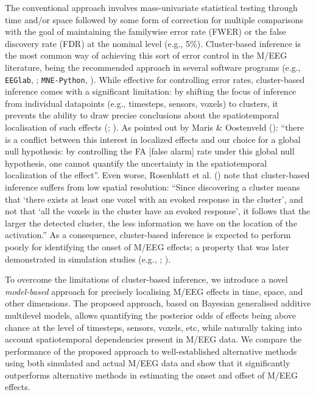 \documentclass[
  doc,
  floatsintext,
  longtable,
  a4paper,
  nolmodern,
  notxfonts,
  notimes,
  colorlinks=true,linkcolor=blue,citecolor=blue,urlcolor=blue]{apa7}
\begin{document}
The conventional approach involves mass-univariate statistical testing
through time and/or space followed by some form of correction for
multiple comparisons with the goal of maintaining the familywise error
rate (FWER) or the false discovery rate (FDR) at the nominal level
(e.g., 5\%). Cluster-based inference is the most common way of achieving
this sort of error control in the M/EEG literature, being the
recommended approach in several software programs (e.g.,
\texttt{EEGlab}, ;
\texttt{MNE-Python}, ). While
effective for controlling error rates, cluster-based inference comes
with a significant limitation: by shifting the focus of inference from
individual datapoints (e.g., timesteps, sensors, voxels) to clusters, it
prevents the ability to draw precise conclusions about the
spatiotemporal localisation of such effects
(;
). As
pointed out by Maris \& Oostenveld ():
``there is a conflict between this interest in localized effects and our
choice for a global null hypothesis: by controlling the FA {[}false
alarm{]} rate under this global null hypothesis, one cannot quantify the
uncertainty in the spatiotemporal localization of the effect''. Even
worse, Rosenblatt et al. () note that
cluster-based inference suffers from low spatial resolution: ``Since
discovering a cluster means that `there exists at least one voxel with
an evoked response in the cluster', and not that `all the voxels in the
cluster have an evoked response', it follows that the larger the
detected cluster, the less information we have on the location of the
activation.'' As a consequence, cluster-based inference is expected to
perform poorly for identifying the onset of M/EEG effects; a property
that was later demonstrated in simulation studies (e.g.,
;
).

To overcome the limitations of cluster-based inference, we introduce a
novel \emph{model-based} approach for precisely localising M/EEG effects
in time, space, and other dimensions. The proposed approach, based on
Bayesian generalised additive multilevel models, allows quantifying the
posterior odds of effects being above chance at the level of timesteps,
sensors, voxels, etc, while naturally taking into account spatiotemporal
dependencies present in M/EEG data. We compare the performance of the
proposed approach to well-established alternative methods using both
simulated and actual M/EEG data and show that it significantly
outperforms alternative methods in estimating the onset and offset of
M/EEG effects.
\end{document}
